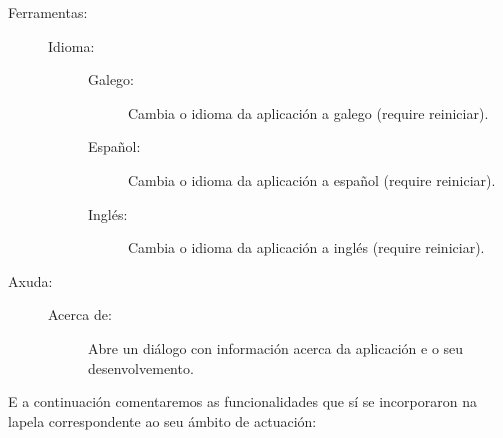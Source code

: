 \begin{description}
\begin{description}
\end{description}

\item[Ferramentas:] \hfill

\begin{description}

\item[Idioma:] \hfill

\begin{description}

\item[Galego:] \hfill
Cambia o idioma da aplicación a galego (require reiniciar).

\end{description}

\begin{description}

\item[Español:] \hfill
Cambia o idioma da aplicación a español (require reiniciar).

\end{description}

\begin{description}

\item[Inglés:] \hfill
Cambia o idioma da aplicación a inglés (require reiniciar).

\end{description}

\end{description}

\item[Axuda:] \hfill

\begin{description}

\item[Acerca de:] \hfill
Abre un diálogo con información acerca da aplicación e o seu desenvolvemento.

\end{description}

\end{description}

E a continuación comentaremos as funcionalidades que sí se incorporaron na lapela correspondente ao seu ámbito de actuación:

